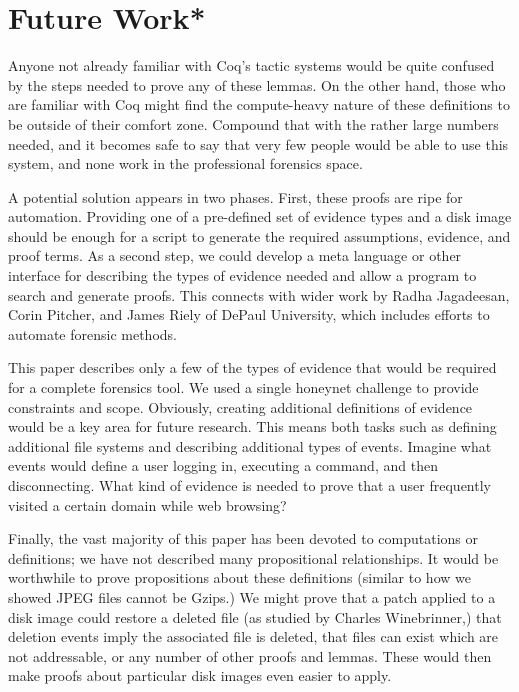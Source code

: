 \documentclass[nocopyrightspace]{sigplanconf}
\begin{document}
\section{Future Work*}
\label{sec:future}

Anyone not already familiar with Coq's tactic systems would be quite confused
by the steps needed to prove any of these lemmas. On the other hand, those who
are familiar with Coq might find the compute-heavy nature of these definitions
to be outside of their comfort zone. Compound that with the rather large
numbers needed, and it becomes safe to say that very few people would be able
to use this system, and none work in the professional forensics space.

A potential solution appears in two phases. First, these proofs are ripe for
automation. Providing one of a pre-defined set of evidence types and a disk
image should be enough for a script to generate the required assumptions,
evidence, and proof terms. As a second step, we could develop a meta language
or other interface for describing the types of evidence needed and allow a
program to search and generate proofs. This connects with wider work by Radha
Jagadeesan, Corin Pitcher, and James Riely of DePaul University, which
includes efforts to automate forensic methods.

This paper describes only a few of the types of evidence that would be
required for a complete forensics tool. We used a single honeynet challenge to
provide constraints and scope. Obviously, creating additional definitions of
evidence would be a key area for future research. This means both tasks such
as defining additional file systems and describing additional types of events.
Imagine what events would define a user logging in, executing a command, and
then disconnecting. What kind of evidence is needed to prove that a user
frequently visited a certain domain while web browsing?

Finally, the vast majority of this paper has been devoted to computations or
definitions; we have not described many propositional relationships. It would
be worthwhile to prove propositions about these definitions (similar to how we
showed JPEG files cannot be Gzips.) We might prove that a patch applied to a
disk image could restore a deleted file (as studied by Charles Winebrinner,)
that deletion events imply the associated file is deleted, that files can
exist which are not addressable, or any number of other proofs and lemmas.
These would then make proofs about particular disk images even easier to
apply.
\end{document}
